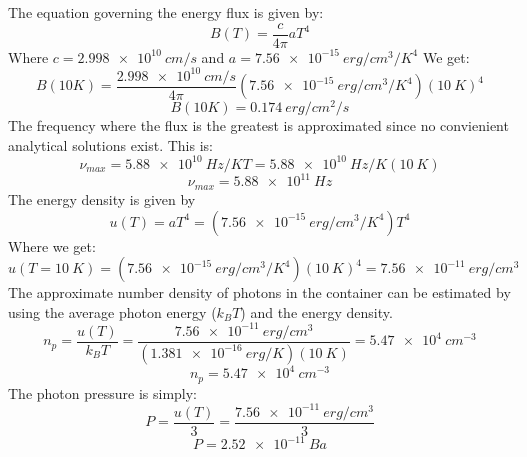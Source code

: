 The equation governing the energy flux is given by:
\begin{equation}
    B(T) = \frac{c}{4\pi}aT^4
\end{equation}
Where $c = \qty{2.998e10}{cm/s}$ and $a = \qty{7.56e-15}{erg/cm^3/K^4}$
We get:
\begin{equation}
    B(10K) = \frac{\qty{2.998e10}{cm/s}}{4\pi}(\qty{7.56e-15}{erg/cm^3/K^4})(\qty{10}{K})^4
\end{equation}
\begin{equation*}
    \boxed{B(10K)= \qty{0.174}{erg/cm^2/s}}
\end{equation*}
The frequency where the flux is the greatest is approximated since no convienient analytical solutions exist. This is:
\begin{equation}
    \nu_{max} = \qty{5.88e10}{Hz/K}T = \qty{5.88e10}{Hz/K}(\qty{10}{K})
\end{equation}
\begin{equation*}
    \boxed{\nu_{max} = \qty{5.88e11}{Hz}}
\end{equation*}
The energy density is given by 
\begin{equation}
    u(T) = aT^4 = (\qty{7.56e-15}{erg/cm^3/K^4})T^4
\end{equation}
Where we get:
\begin{equation*}
    u(T = \qty{10}{K}) = (\qty{7.56e-15}{erg/cm^3/K^4})(\qty{10}{K})^4 = \boxed{\qty{7.56e-11}{erg/cm^3}}
\end{equation*}
The approximate number density of photons in the container can be estimated by using the average photon energy ($k_B T$) and the energy density.
\begin{equation*}
    n_p = \frac{u(T)}{k_B T} = \frac{\qty{7.56e-11}{erg/cm^3}}{(\qty{1.381e-16}{erg/K})(\qty{10}{K})} = \qty{5.47e4}{cm^{-3}}
\end{equation*}
\begin{equation*}
    \boxed{n_p = \qty{5.47e4}{cm^{-3}}} 
\end{equation*}
The photon pressure is simply:
\begin{equation}
    P = \frac{u(T)}{3} = \frac{\qty{7.56e-11}{erg/cm^3}}{3}
\end{equation}
\begin{equation}
    \boxed{P = \qty{2.52e-11}{Ba}}
\end{equation}
\clearpage